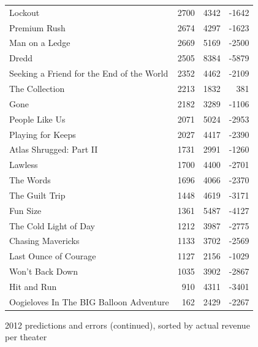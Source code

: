 \documentclass[10pt]{article}
\begin{document}
\begin{figure}[ht]
\begin{tabular}{l|r|r|r}
            Lockout & 2700 & 4342 & -1642 \\
            Premium Rush & 2674 & 4297 & -1623 \\
            Man on a Ledge & 2669 & 5169 & -2500 \\
            Dredd & 2505 & 8384 & -5879 \\
            Seeking a Friend for the End of the World & 2352 & 4462 & -2109 \\
            The Collection & 2213 & 1832 & 381 \\
            Gone & 2182 & 3289 & -1106 \\
            People Like Us & 2071 & 5024 & -2953 \\
            Playing for Keeps & 2027 & 4417 & -2390 \\
            Atlas Shrugged: Part II & 1731 & 2991 & -1260 \\
            Lawless & 1700 & 4400 & -2701 \\
            The Words & 1696 & 4066 & -2370 \\
            The Guilt Trip & 1448 & 4619 & -3171 \\
            Fun Size & 1361 & 5487 & -4127 \\
            The Cold Light of Day & 1212 & 3987 & -2775 \\
            Chasing Mavericks & 1133 & 3702 & -2569 \\
            Last Ounce of Courage & 1127 & 2156 & -1029 \\
            Won't Back Down & 1035 & 3902 & -2867 \\
            Hit and Run & 910 & 4311 & -3401 \\
            Oogieloves In The BIG Balloon Adventure & 162 & 2429 & -2267 \\
            \hline
        \end{tabular}
        \caption{2012 predictions and errors (continued), sorted by actual revenue per theater}
    \end{figure}
    
\end{document}
